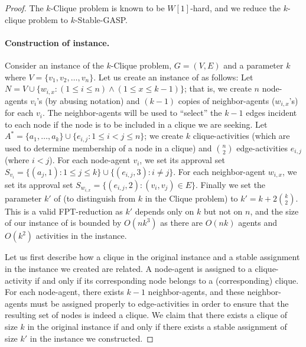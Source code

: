 \begin{proof} 
	The $k$-Clique problem is known to be $W[1]$-hard, and we reduce the $k$-clique problem to $k$-Stable-GASP. 
	
	\paragraph{Construction of \GASPs instance.}
	Consider an instance of the $k$-Clique problem, $G = (V, E)$ and a parameter $k$ where $V = \{v_1, v_2, \dots, v_n\}$.
	Let us create an instance of \GASPs as follows: Let $N = V \cup \{w_{i, x} : (1 \leq i \leq n) \land (1 \leq x \leq k-1)\}$; that is, we create $n$ node-agents $v_i$'s (by abusing notation) and $(k-1)$ copies of neighbor-agents ($w_{i,x}$'s) for each $v_i$. The neighbor-agents will be used to ``select'' the $k-1$ edges incident to each node if the node is to be included in a clique we are seeking.
	Let $A^* = \{a_1, \dots, a_k \} \cup \{ e_{i,j} : 1 \leq i < j \leq n \}$; we create $k$ clique-activities (which are used to determine membership of a node in a clique) and $\binom{n}{2}$ edge-activities $e_{i,j}$ (where $i<j$).
 	For each node-agent $v_i$, we set its approval set $S_{v_i} = \{(a_j, 1) : 1 \leq j \leq k\} \cup \{(e_{i,j}, 3) : i \neq j\}$. 
 	For each neighbor-agent $w_{i, x}$, we set its approval set $S_{w_{i,x}} = \{(e_{i,j}, 2) : (v_i, v_j) \in E\}$.
 	Finally	we set the parameter $k'$ of \GASPs (to distinguish from $k$ in the Clique problem) to $k'=k+2\binom{k}{2}$.
	This is a valid FPT-reduction as $k'$ depends only on $k$ but not on $n$, and the size of our instance of \GASPs is bounded by $O(nk^3)$ as there are $O(nk)$ agents and $O(k^2)$ activities in the instance.

	Let us first describe how a clique in the original instance and a stable assignment in the \GASPs instance we created are related. A node-agent is assigned to a clique-activity if and only if its corresponding node belongs to a (corresponding) clique. For each node-agent, there exists $k-1$ neighbor-agents, and these neighbor-agents must be assigned properly to edge-activities in order to ensure that the resulting set of nodes is indeed a clique. 		 
	We claim that there exists a clique of size $k$ in the original instance if and only if there exists a stable assignment of size $k'$ in the \GASPs instance we constructed. 
 	

\end{proof}
